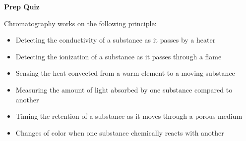 \vfil \eject

\noindent
{\bf Prep Quiz}

Chromatography works on the following principle:

\begin{itemize}
\item{} Detecting the conductivity of a substance as it passes by a heater
\vskip 5pt
\item{} Detecting the ionization of a substance as it passes through a flame
\vskip 5pt
\item{} Sensing the heat convected from a warm element to a moving substance
\vskip 5pt
\item{} Measuring the amount of light absorbed by one substance compared to another
\vskip 5pt
\item{} Timing the retention of a substance as it moves through a porous medium
\vskip 5pt
\item{} Changes of color when one substance chemically reacts with another
\end{itemize}




